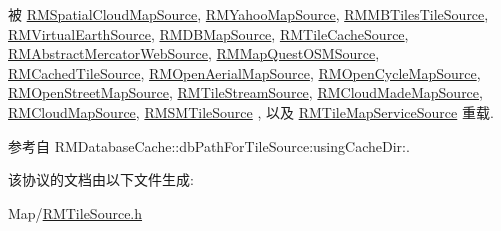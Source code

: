 被 \hyperlink{interface_r_m_spatial_cloud_map_source_acb584cc15f37012168e4a81be5fb1a5d}{R\-M\-Spatial\-Cloud\-Map\-Source}, \hyperlink{interface_r_m_yahoo_map_source_aef91c1e282958b4c0f69e3ca885e28e9}{R\-M\-Yahoo\-Map\-Source}, \hyperlink{interface_r_m_m_b_tiles_tile_source_ab71dd47e8661b24cb264932e78b666a6}{R\-M\-M\-B\-Tiles\-Tile\-Source}, \hyperlink{interface_r_m_virtual_earth_source_a8b7b461c2e4a8a89d51ca08e6d9d7628}{R\-M\-Virtual\-Earth\-Source}, \hyperlink{interface_r_m_d_b_map_source_a49c20adf6dafd4221bdc2ea1a93077e0}{R\-M\-D\-B\-Map\-Source}, \hyperlink{interface_r_m_tile_cache_source_a0fc37a76b0161717c4bf0de4a03d5fe0}{R\-M\-Tile\-Cache\-Source}, \hyperlink{interface_r_m_abstract_mercator_web_source_acf45b84d8f39ef7fcc2a92a2e320a9a2}{R\-M\-Abstract\-Mercator\-Web\-Source}, \hyperlink{interface_r_m_map_quest_o_s_m_source_ac5f1fbdc160544d60e9706b4e8e0c6a5}{R\-M\-Map\-Quest\-O\-S\-M\-Source}, \hyperlink{interface_r_m_cached_tile_source_aa6226fe9784e2f6b47b45ea24d7c062f}{R\-M\-Cached\-Tile\-Source}, \hyperlink{interface_r_m_open_aerial_map_source_a5da92a4a64ec3e3ecb36068b5264ca3f}{R\-M\-Open\-Aerial\-Map\-Source}, \hyperlink{interface_r_m_open_cycle_map_source_a8f454702038372b215a4cfabdce76022}{R\-M\-Open\-Cycle\-Map\-Source}, \hyperlink{interface_r_m_open_street_map_source_a6bf79a7fd62c28cb11979a7d4bdb65b9}{R\-M\-Open\-Street\-Map\-Source}, \hyperlink{interface_r_m_tile_stream_source_ab121a1455447ad90239e7f4ca78ce9a3}{R\-M\-Tile\-Stream\-Source}, \hyperlink{interface_r_m_cloud_made_map_source_aae477f125ad88298f778b14b079a7bbb}{R\-M\-Cloud\-Made\-Map\-Source}, \hyperlink{interface_r_m_cloud_map_source_a7c4d7bb98a9fee5864622a1c5e342dd8}{R\-M\-Cloud\-Map\-Source}, \hyperlink{interface_r_m_s_m_tile_source_aa8ddf038d066c3c34a16ef0818afc061}{R\-M\-S\-M\-Tile\-Source} , 以及 \hyperlink{interface_r_m_tile_map_service_source_a80f88caa0b6ea9310552e62714522348}{R\-M\-Tile\-Map\-Service\-Source} 重载.



参考自 R\-M\-Database\-Cache\-::db\-Path\-For\-Tile\-Source\-:using\-Cache\-Dir\-:.



该协议的文档由以下文件生成\-:\begin{DoxyCompactItemize}
\item 
Map/\hyperlink{_r_m_tile_source_8h}{R\-M\-Tile\-Source.\-h}\end{DoxyCompactItemize}
